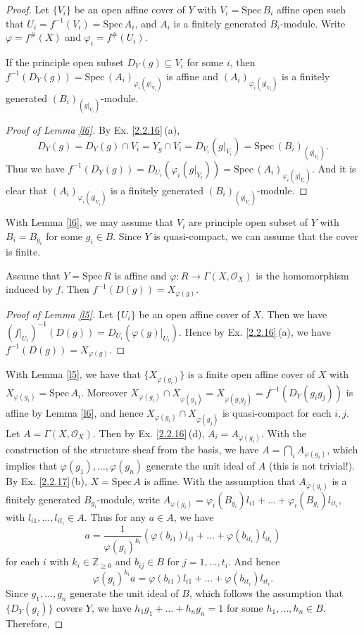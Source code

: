 \begin{proof}
	Let $\{V_i\}$ be an open affine cover of $Y$ with $V_i=\mathrm{Spec}\,B_i$ affine open such that $U_i=f^{-1}(V_i)=\mathrm{Spec}\,A_i$, and $A_i$ is a finitely generated $B_i$-module. Write $\varphi=f^\#(X)$ and $\varphi_i=f^\#(U_i)$.
	\begin{lm}
		\label{l6}
		If the principle open subset $D_Y(g)\subseteq V_i$ for some $i$, then $f^{-1}(D_Y(g))=\mathrm{Spec}\,(A_i)_{\varphi_i(g|_{V_i})}$ is affine and $(A_i)_{\varphi_{i}(g|_{V_i})}$ is a finitely generated $(B_i)_{(g|_{V_i})}$-module.
	\end{lm}
	\begin{proof}[Proof of Lemma \ref*{l6}]
		By Ex. \ref{2.2.16}\,(a), $$D_Y(g)=D_Y(g)\cap V_i=Y_g\cap V_i=D_{V_i}(g|_{V_i})=\mathrm{Spec}\,(B_i)_{(g|_{V_i})}.$$ Thus we have $f^{-1}(D_Y(g))=D_{U_i}(\varphi_i(g|_{V_i}))=\mathrm{Spec}\,(A_i)_{\varphi_i(g|_{V_i})}.$ And it is clear that $(A_i)_{\varphi_{i}(g|_{V_i})}$ is a finitely generated $(B_i)_{(g|_{V_i})}$-module.
	\end{proof}
	With Lemma \ref{l6}, we may assume that $V_i$ are principle open subset of $Y$ with $B_i=B_{g_i}$ for some $g_i\in B$. Since $Y$ is quasi-compact, we can assume that the cover is finite.
	\begin{lm}
		\label{l5}
		Assume that $Y=\mathrm{Spec}\,R$ is affine and $\varphi:R\to\Gamma(X,\mathcal{O}_X)$ is the homomorphism induced by $f$. Then $f^{-1}(D(g))=X_{\varphi(g)}$.
	\end{lm}
	\begin{proof}[Proof of Lemma \ref*{l5}]
		Let $\{U_i\}$ be an open affine cover of $X$. Then we have $(f|_{U_i})^{-1}(D(g))=D_{U_i}(\varphi(g)|_{U_i})$. Hence by Ex. \ref{2.2.16}\,(a), we have $f^{-1}(D(g))=X_{\varphi(g)}$.
	\end{proof}
	With Lemma \ref{l5}, we have that $\{X_{\varphi(g_i)}\}$ is a finite open affine cover of $X$ with $X_{\varphi(g_i)}=\mathrm{Spec}\,A_i$. Moreover $X_{\varphi(g_i)}\cap X_{\varphi(g_j)}=X_{\varphi(g_ig_j)}=f^{-1}(D_Y(g_ig_j))$ is affine by Lemma \ref{l6}, and hence $X_{\varphi(g_i)}\cap X_{\varphi(g_j)}$ is quasi-compact for each $i,j$. Let $A=\Gamma(X,\mathcal{O}_X)$. Then by Ex. \ref{2.2.16}\,(d), $A_i=A_{\varphi(g_i)}$. With the construction of the structure sheaf from the basis, we have $A=\bigcap_iA_{\varphi(g_i)}$, which implies that $\varphi(g_1),\dots,\varphi(g_n)$ generate the unit ideal of $A$ (this is not trivial!). By Ex. \ref{2.2.17}\,(b), $X=\mathrm{Spec}\,A$ is affine. With the assumption that $A_{\varphi(g_i)}$ is a finitely generated $B_{g_i}$-module, write $A_{\varphi(g_i)}=\varphi_i(B_{g_i})l_{i1}+\dots+\varphi_i(B_{g_i})l_{it_i}$, with $l_{i1},\dots,l_{it_i}\in A$. Thus for any $a\in A$, we have $$a=\frac{1}{\varphi(g_i)^{k_i}}(\varphi(b_{i1})l_{i1}+\dots+\varphi(b_{it_i})l_{it_i})$$for each $i$ with $k_i\in\mathbb{Z}_{\geq0}$ and $b_{ij}\in B$ for $j=1,\dots,t_i$. And hence$$\varphi(g_i)^{k_i}a=\varphi(b_{i1})l_{i1}+\dots+\varphi(b_{it_i})l_{it_i}.$$Since $g_1,\dots,g_n$ generate the unit ideal of $B$, which follows the assumption that $\{D_Y(g_i)\}$ covers $Y$, we have $h_1g_1+\dots+h_ng_n=1$ for some $h_1,\dots,h_n\in B$. Therefore,

\end{proof}
